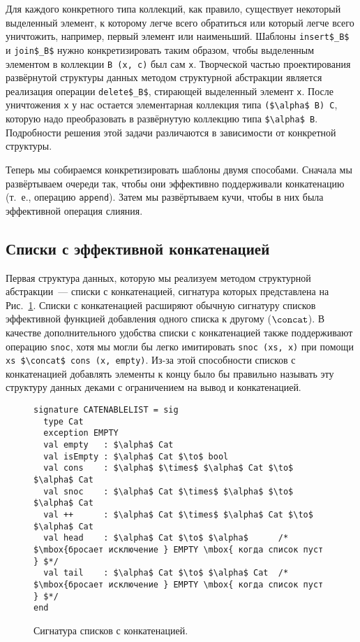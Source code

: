 Для каждого конкретного типа коллекций, как правило, существует
некоторый выделенный элемент, к которому легче всего обратиться или
который легче всего уничтожить, например, первый элемент или
наименьший.  Шаблоны \lstinline!insert$_B$! и
\lstinline!join$_B$! нужно конкретизировать таким образом, чтобы
выделенным элементом в коллекции \lstinline!B (x, c)! был сам
\lstinline!x!. Творческой частью проектирования развёрнутой структуры
данных методом структурной абстракции является реализация операции
\lstinline!delete$_B$!, стирающей выделенный элемент \lstinline!x!.
После уничтожения \lstinline!x! у нас остается элементарная коллекция
типа \lstinline!($\alpha$ B) C!, которую надо преобразовать в
развёрнутую коллекцию типа \lstinline!$\alpha$ B!. Подробности
решения этой задачи различаются в зависимости от конкретной структуры.

Теперь мы собираемся конкретизировать шаблоны двумя способами. Сначала
мы развёртываем очереди так, чтобы они эффективно поддерживали конкатенацию
(т.~е., операцию \lstinline!append!). Затем мы развёртываем кучи,
чтобы в них была эффективной операция слияния.

\subsection{Списки с эффективной конкатенацией}
\label{sc:10.2.1}

Первая структура данных, которую мы реализуем методом структурной
абстракции~--- списки с конкатенацией, сигнатура которых представлена
на Рис.~\ref{fig:10.3}. Списки с конкатенацией расширяют обычную
сигнатуру списков эффективной функцией добавления одного списка к
другому ($\concat$). В качестве дополнительного удобства списки с
конкатенацией также поддерживают операцию \lstinline!snoc!, хотя мы
могли бы легко имитировать \lstinline!snoc (xs, x)! при помощи
\lstinline!xs $\concat$ cons (x, empty)!. Из-за этой
способности списков с конкатенацией добавлять элементы к концу было бы
правильно называть эту структуру данных деками с ограничением на вывод и
конкатенацией.

\begin{figure}
  \centering
\begin{lstlisting}  
signature CATENABLELIST = sig 
  type Cat
  exception EMPTY
  val empty   : $\alpha$ Cat
  val isEmpty : $\alpha$ Cat $\to$ bool
  val cons    : $\alpha$ $\times$ $\alpha$ Cat $\to$ $\alpha$ Cat
  val snoc    : $\alpha$ Cat $\times$ $\alpha$ $\to$ $\alpha$ Cat
  val ++      : $\alpha$ Cat $\times$ $\alpha$ Cat $\to$ $\alpha$ Cat
  val head    : $\alpha$ Cat $\to$ $\alpha$      /* $\mbox{бросает исключение } EMPTY \mbox{ когда список пуст } $*/
  val tail    : $\alpha$ Cat $\to$ $\alpha$ Cat  /* $\mbox{бросает исключение } EMPTY \mbox{ когда список пуст } $*/
end
\end{lstlisting}  
  \caption{Сигнатура списков с конкатенацией.}
  \label{fig:10.3}
\end{figure}

